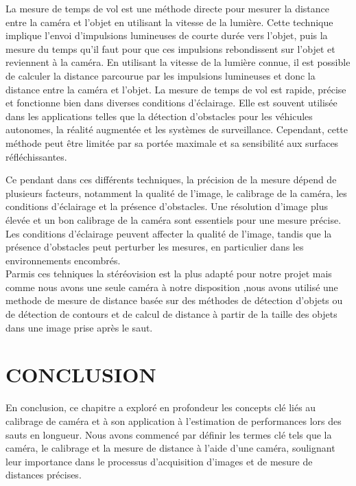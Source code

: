 \begin{itemize}[label={\Huge$\star$}]
 	La mesure de temps de vol est une méthode directe pour mesurer la distance entre la caméra et l'objet en utilisant la vitesse de la lumière. Cette technique implique l'envoi d'impulsions lumineuses de courte durée vers l'objet, puis la mesure du temps qu'il faut pour que ces impulsions rebondissent sur l'objet et reviennent à la caméra. En utilisant la vitesse de la lumière connue, il est possible de calculer la distance parcourue par les impulsions lumineuses et donc la distance entre la caméra et l'objet. La mesure de temps de vol est rapide, précise et fonctionne bien dans diverses conditions d'éclairage. Elle est souvent utilisée dans les applications telles que la détection d'obstacles pour les véhicules autonomes, la réalité augmentée et les systèmes de surveillance. Cependant, cette méthode peut être limitée par sa portée maximale et sa sensibilité aux surfaces réfléchissantes.

 \end{itemize}

Ce pendant dans ces différents techniques, la précision de la mesure dépend de plusieurs facteurs, notamment la qualité de l'image, le calibrage de la caméra, les conditions d'éclairage et la présence d'obstacles. Une résolution d'image plus élevée et un bon calibrage de la caméra sont essentiels pour une mesure précise. Les conditions d'éclairage peuvent affecter la qualité de l'image, tandis que la présence d'obstacles peut perturber les mesures, en particulier dans les environnements encombrés.\\

Parmis ces tehniques la stéréovision est la plus adapté pour notre projet mais comme nous avons une seule caméra à notre disposition ,nous avons utilisé une methode de mesure de distance basée sur des méthodes de détection d'objets ou de détection de contours et de calcul de distance à partir de la taille des objets dans une image prise après le saut.


\newpage
\section{CONCLUSION}

En conclusion, ce chapitre a exploré en profondeur les concepts clé liés au calibrage de caméra et à son application à l'estimation de performances lors des sauts en longueur. Nous avons commencé par définir les termes clé tels que la caméra, le calibrage et la mesure de distance à l'aide d'une caméra, soulignant leur importance dans le processus d'acquisition d'images et de mesure de distances précises.

